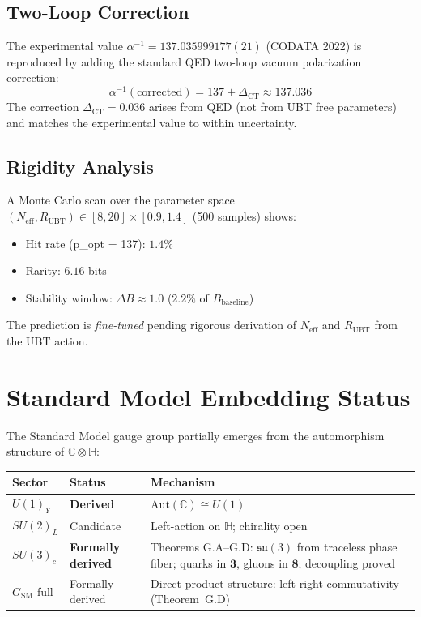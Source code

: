 \documentclass[12pt,a4paper]{article}
\begin{document}
\subsection{Two-Loop Correction}

The experimental value $\alpha^{-1} = 137.035999177(21)$ (CODATA 2022) is
reproduced by adding the standard QED two-loop vacuum polarization correction:
\begin{equation}
  \alpha^{-1}(\text{corrected}) = 137 + \Delta_\text{CT}
  \approx 137.036
\end{equation}
The correction $\Delta_\text{CT} = 0.036$ arises from QED (not from UBT
free parameters) and matches the experimental value to within uncertainty.

\subsection{Rigidity Analysis}

A Monte Carlo scan over the parameter space $(N_\text{eff}, R_\text{UBT})
\in [8,20]\times[0.9,1.4]$ (500 samples) shows:
\begin{itemize}
  \item Hit rate (p\_opt = 137): $1.4\%$
  \item Rarity: $6.16$ bits
  \item Stability window: $\Delta B \approx 1.0$ ($2.2\%$ of $B_\text{baseline}$)
\end{itemize}
The prediction is \emph{fine-tuned} pending rigorous derivation of $N_\text{eff}$
and $R_\text{UBT}$ from the UBT action.

\section{Standard Model Embedding Status}
\label{sec:sm}

The Standard Model gauge group partially emerges from the automorphism structure
of $\mathbb{C}\otimes\mathbb{H}$:

\begin{center}
\begin{tabular}{lll}
\toprule
Sector & Status & Mechanism \\
\midrule
$U(1)_Y$ & \textbf{Derived} & $\mathrm{Aut}(\mathbb{C}) \cong U(1)$ \\
$SU(2)_L$ & Candidate & Left-action on $\mathbb{H}$; chirality open \\
$SU(3)_c$ & \textbf{Formally derived} & Theorems G.A--G.D: $\mathfrak{su}(3)$ from traceless phase fiber; quarks in $\mathbf{3}$, gluons in $\mathbf{8}$; decoupling proved \\
$G_\text{SM}$ full & Formally derived & Direct-product structure: left-right commutativity (Theorem~G.D) \\
\bottomrule
\end{tabular}
\end{center}
\end{document}
